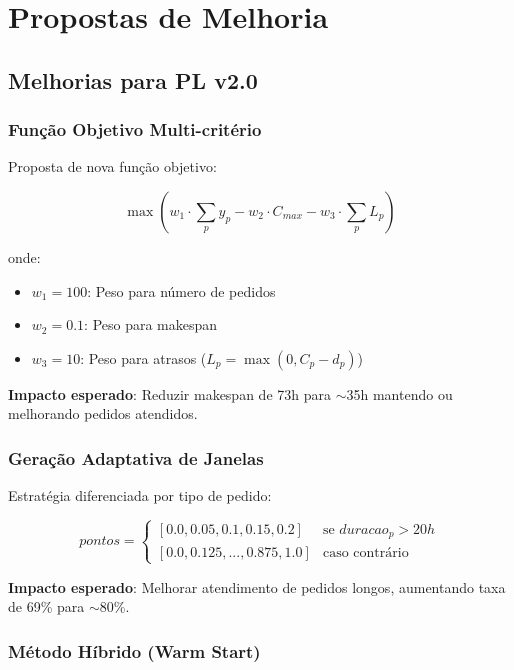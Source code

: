 \documentclass[12pt,a4paper]{article}
\theoremstyle{definition}
\begin{document}
\section{Propostas de Melhoria}

\subsection{Melhorias para PL v2.0}

\subsubsection{Função Objetivo Multi-critério}

Proposta de nova função objetivo:

\begin{equation}
\max \left( w_1 \cdot \sum_p y_p - w_2 \cdot C_{max} - w_3 \cdot \sum_p L_p \right)
\end{equation}

onde:
\begin{itemize}
    \item $w_1 = 100$: Peso para número de pedidos
    \item $w_2 = 0.1$: Peso para makespan
    \item $w_3 = 10$: Peso para atrasos ($L_p = \max(0, C_p - d_p)$)
\end{itemize}

\textbf{Impacto esperado}: Reduzir makespan de 73h para $\sim$35h mantendo ou melhorando pedidos atendidos.

\subsubsection{Geração Adaptativa de Janelas}

Estratégia diferenciada por tipo de pedido:

\begin{equation}
pontos = \begin{cases}
[0.0, 0.05, 0.1, 0.15, 0.2] & \text{se } duracao_p > 20h \\
[0.0, 0.125, ..., 0.875, 1.0] & \text{caso contrário}
\end{cases}
\end{equation}

\textbf{Impacto esperado}: Melhorar atendimento de pedidos longos, aumentando taxa de 69\% para $\sim$80\%.

\subsubsection{Método Híbrido (Warm Start)}
\end{document}
